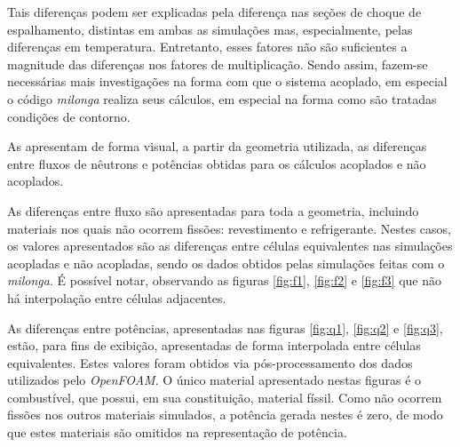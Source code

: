 Tais diferenças podem ser explicadas pela diferença nas seções de choque de espalhamento,
distintas em ambas as simulações mas, especialmente, pelas diferenças em temperatura.
Entretanto, esses fatores não são suficientes a magnitude das diferenças nos fatores
de multiplicação. Sendo assim, fazem-se necessárias mais investigações na forma com
que o sistema acoplado, em especial o código \textit{milonga} realiza seus cálculos,
em especial na forma como são tratadas condições de contorno.

As  apresentam de forma visual, a partir da geometria utilizada,
as diferenças entre fluxos de nêutrons e potências obtidas para os cálculos
acoplados e não acoplados.

As diferenças entre fluxo são apresentadas para toda a geometria, incluindo materiais nos quais
não ocorrem fissões: revestimento e refrigerante. Nestes casos, os valores apresentados são
as diferenças entre células equivalentes nas simulações acopladas e não acopladas, sendo
os dados obtidos pelas simulações feitas com o \textit{milonga}. É possível notar, observando
as figuras \ref{fig:f1}, \ref{fig:f2} e \ref{fig:f3} que não há interpolação entre células
adjacentes.

As diferenças entre potências, apresentadas nas figuras \ref{fig:q1}, \ref{fig:q2} e \ref{fig:q3},
estão, para fins de exibição, apresentadas de forma interpolada entre células equivalentes. Estes valores
foram obtidos via pós-processamento dos dados utilizados pelo \textit{OpenFOAM}. O único material
apresentado nestas figuras é o combustível, que possui, em sua constituição, material físsil. Como
não ocorrem fissões nos outros materiais simulados, a potência gerada nestes é zero, de modo
que estes materiais são omitidos na representação de potência.

